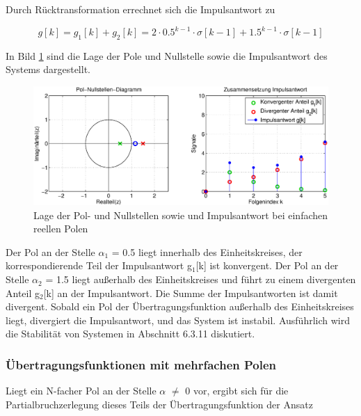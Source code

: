 \noindent Durch R\"{u}cktransformation errechnet sich die Impulsantwort zu

\begin{equation}\label{eq:sixsninetyfour}
g\left[k\right]=g_{1} \left[k\right]+g_{2} \left[k\right]=2\cdot 0.5^{k-1} \cdot \sigma \left[k-1\right]+1.5^{k-1} \cdot \sigma \left[k-1\right]
\end{equation}

\noindent In Bild \ref{fig:SystemReellePole} sind die Lage der Pole und Nullstelle sowie die Impulsantwort des Systems dargestellt.

\begin{figure}[H]
  \centerline{\includegraphics[width=1\textwidth]{Kapitel6/Bilder/image10.eps}}
  \caption{Lage der Pol- und Nullstellen sowie und Impulsantwort bei einfachen reellen Polen}
  \label{fig:SystemReellePole}
\end{figure}

\noindent Der Pol an der Stelle $\alpha_{1}$ = 0.5 liegt innerhalb des Einheitskreises, der korrespondierende Teil der Impulsantwort g${}_{1}$[k] ist konvergent. Der Pol an der Stelle $\alpha_{2}$ = 1.5 liegt au{\ss}erhalb des Einheitskreises und f\"{u}hrt zu einem divergenten Anteil g${}_{2}$[k] an der Impulsantwort. Die Summe der Impulsantworten ist damit divergent. Sobald ein Pol der \"{U}bertragungsfunktion au{\ss}erhalb des Einheitskreises liegt, divergiert die Impulsantwort, und das System ist instabil. Ausf\"{u}hrlich wird die Stabilit\"{a}t von Systemen in Abschnitt 6.3.11 diskutiert.

\subsubsection{\"{U}bertragungsfunktionen mit mehrfachen Polen}

\noindent Liegt ein N-facher Pol an der Stelle $\alpha$ $\neq$ 0 vor, ergibt sich f\"{u}r die Partialbruchzerlegung dieses Teils der \"{U}bertragungsfunktion der Ansatz

